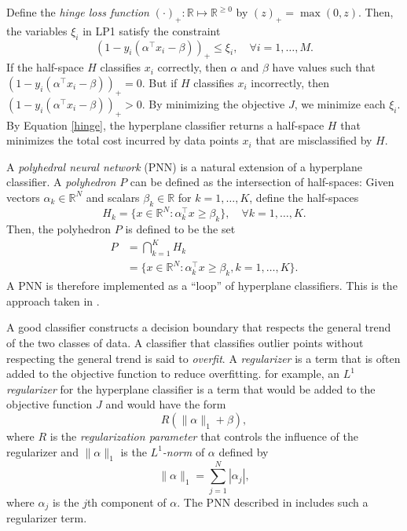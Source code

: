 \documentclass[12pt, a4paper, notitlepage]{report}
\newcommand{\RR}{\mathbb{R}}
\begin{document}
Define the \emph{hinge loss function} $(\cdot)_+:\RR\mapsto\RR^{\geq 0}$ by $(z)_+ = \max(0, z)$. Then, the variables $\xi_i$ in LP1 satisfy the constraint
\begin{equation} \label		{hinge}
(1-y_i(\alpha^\top x_i-\beta))_+ \leq \xi_i, \quad\forall i=1,\ldots,M.
\end{equation}
If the half-space $H$ classifies $x_i$ correctly, then $\alpha$ and $\beta$ have values such that $(1-y_i(\alpha^\top x_i-\beta))_+=0$. But if $H$ classifies $x_i$ incorrectly, then $(1-y_i(\alpha^\top x_i-\beta))_+>0$. By minimizing the objective $J$, we minimize each $\xi_i$. By Equation \ref{hinge}, the hyperplane classifier returns a half-space $H$ that minimizes the total cost incurred by data points $x_i$ that are misclassified by $H$.

A \emph{polyhedral neural network} (PNN) is a natural extension of a hyperplane classifier. A \emph{polyhedron}  $P$ can be defined as the intersection of half-spaces: Given vectors $\alpha_k\in\RR^N$ and scalars $\beta_k\in\RR$ for $k=1,\ldots,K$, define the half-spaces
\begin{equation} \label{H_k}
H_k = \{x\in\RR^N: \alpha_k^\top x\geq \beta_k\}, \quad\forall k=1,\ldots,K.
\end{equation}
Then, the polyhedron $P$ is defined to be the set
\begin{align}
P &= \bigcap_{k=1}^K H_k \nonumber \\
&= \{x\in\RR^N: \alpha_k^\top x \geq \beta_k, k=1,\ldots,K\}. \label{P}
\end{align}
A PNN is therefore implemented as a ``loop'' of hyperplane classifiers. This is the approach taken in \cite{Dundar}.

A good classifier constructs a decision boundary that respects the general trend of the two classes of data. A classifier that classifies outlier points without respecting the general trend is said to \emph{overfit}. A \emph{regularizer} is a term that is often added to the objective function to reduce overfitting. for example, an \emph{$L^1$ regularizer} for the hyperplane classifier is a term that would be added to the objective function $J$ and would have the form
\[ R (\|\alpha\|_1+\beta), \]
where $R$ is the \emph{regularization parameter} that controls the influence of the regularizer and $\|\alpha\|_1$ is the \emph{$L^1$-norm} of $\alpha$ defined by
\[ \|\alpha\|_1 = \sum_{j=1}^N |\alpha_j|, \]
where $\alpha_j$ is the $j$th component of $\alpha$. The PNN described in \cite{Dundar} includes such a regularizer term.
\end{document}
